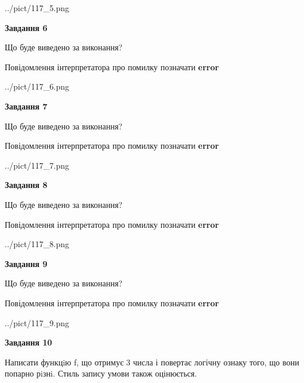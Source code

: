 \documentclass[12pt, ukrainian]{article}
\begin{document}
{\begin {large}
\begin{center}
	{../pict/117_5.png}
\end{center}
\newpage

{\begin {center}\textbf{Завдання 6}\end {center}}\par
Що буде виведено за виконання? \par
Повідомлення інтерпретатора про помилку позначати \textbf{error}

\begin{center}
	{../pict/117_6.png}
\end{center}
\newpage

{\begin {center}\textbf{Завдання 7}\end {center}}\par
Що буде виведено за виконання? \par
Повідомлення інтерпретатора про помилку позначати \textbf{error}

\begin{center}
	{../pict/117_7.png}
\end{center}
\newpage

{\begin {center}\textbf{Завдання 8}\end {center}}\par
Що буде виведено за виконання? \par
Повідомлення інтерпретатора про помилку позначати \textbf{error}

\begin{center}
	{../pict/117_8.png}
\end{center}
\newpage

{\begin {center}\textbf{Завдання 9}\end {center}}\par
Що буде виведено за виконання? \par
Повідомлення інтерпретатора про помилку позначати \textbf{error}

\begin{center}
	{../pict/117_9.png}
\end{center}
\newpage

{\begin {center}\textbf{Завдання 10}\end {center}}\par

Написати функцiю f, що отримує 3 числа і повертає логічну ознаку того, що вони попарно рiзнi. Стиль запису умови також оцінюється.\par
\newpage

\end {large}}
\end{document}
